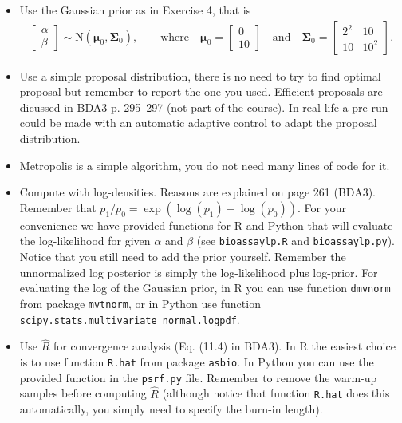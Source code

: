 \documentclass[a4paper,11pt]{article}
\newcommand{\vc}[1] { \mathbf{#1} }
\newcommand{\vs}[1] { \boldsymbol{#1} }
\begin{document}
\begin{itemize}
\item Use the Gaussian prior as in Exercise 4, that is %
\begin{align*}
	\begin{bmatrix}
	\alpha \\ \beta
	\end{bmatrix}
	\sim
	\text{N} \left(\vs \mu_0, \vc \Sigma_0 \right), \qquad
	\text{where} \quad
	\vs \mu_0 = \begin{bmatrix} 0 \\ 10 \end{bmatrix} \quad \text{and} \quad
	\vc \Sigma_0 = \begin{bmatrix} 2^2 & 10 \\ 10 & 10^2 \end{bmatrix}.
\end{align*}
\item Use a simple proposal distribution, there is no need to try to find optimal proposal but remember to report the one you used. Efficient proposals are dicussed in BDA3 p. 295--297 (not part of the course). In real-life a pre-run could be made with an automatic adaptive control to adapt the proposal distribution.
\item Metropolis is a simple algorithm, you do not need many lines of code for it. 
\item Compute with log-densities. Reasons are explained on page 261 (BDA3). Remember that $p_1/p_0=\exp(\log(p_1)-\log(p_0))$. For your convenience we have provided functions for R and Python that will evaluate the log-likelihood for given $\alpha$ and $\beta$ (see {\tt bioassaylp.R} and {\tt bioassaylp.py}). Notice that you still need to add the prior yourself. Remember the unnormalized log posterior is simply the log-likelihood plus log-prior. For evaluating the log of the Gaussian prior, in R you can use function {\tt dmvnorm} from package {\tt mvtnorm}, or in Python use function {\tt scipy.stats.multivariate\_normal.logpdf}.
\item Use $\hat{R}$ for convergence analysis (Eq. (11.4) in BDA3). In R the easiest choice is to use function {\tt R.hat} from package {\tt asbio}. In Python you can use the provided function in the {\tt psrf.py} file. Remember to remove the warm-up samples before computing $\hat R$ (although notice that function {\tt R.hat} does this automatically, you simply need to specify the burn-in length). 


\end{itemize}
\end{document}
